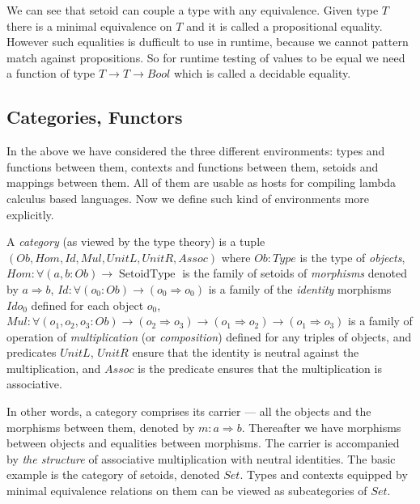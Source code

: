 \documentclass[11pt,oneside]{article}
\begin{document}
We can see that setoid can couple a type with any equivalence.
Given type $T$ there is a minimal equivalence on $T$ and it is called a propositional equality.
However such equalities is dufficult to use in runtime, because we cannot pattern match against propositions.
So for runtime testing of values to be equal we need a function of type $T \rightarrow T \rightarrow Bool$ which is called a decidable equality.

\subsection{Categories, Functors}

In the above we have considered the three different environments:
types and functions between them,
contexts and functions between them,
setoids and mappings between them.
All of them are usable as hosts for compiling lambda calculus
based languages.
Now we define such kind of environments more explicitly.

A {\em category} (as viewed by the type theory)
is a tuple $(Ob, Hom, Id, Mul, UnitL, UnitR, Assoc)$ where
$Ob : Type$ is the type of {\em objects},
$Hom : \forall(a, b : Ob)\rightarrow \operatorname{SetoidType}$
is the family of
setoids of {\em morphisms} denoted by $a \Rightarrow b$,
$Id : \forall(o_0 : Ob)\rightarrow (o_0 \Rightarrow o_0)$ is a family
of the {\em identity} morphisms $Id o_0$ defined for each object $o_0$,
$Mul : \forall(o_1, o_2, o_3 : Ob) \rightarrow (o_2 \Rightarrow o_3) \rightarrow (o_1 \Rightarrow o_2) \rightarrow (o_1 \Rightarrow o_3)$
is a family of operation of {\em multiplication} (or {\em composition})
defined for any triples of objects, and predicates $UnitL$, $UnitR$
ensure that the identity is neutral against the multiplication, and
$Assoc$ is the predicate ensures that the multiplication is associative.

In other words, a category comprises its carrier ---
all the objects and the morphisms between them,
denoted by $m : a \Rightarrow b$.
Thereafter we have morphisms between objects and equalities between morphisms.
The carrier is accompanied by {\em the structure}
of associative multiplication with neutral identities.
The basic example is the category of setoids, denoted $Set$.
Types and contexts equipped by minimal equivalence relations on them
can be viewed as subcategories of $Set$.
\end{document}
